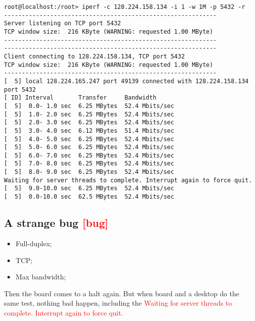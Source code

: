 \documentclass[a4paper]{report}
\begin{document}
\begin{lstlisting}
root@localhost:/root> iperf -c 128.224.158.134 -i 1 -w 1M -p 5432 -r
------------------------------------------------------------
Server listening on TCP port 5432
TCP window size:  216 KByte (WARNING: requested 1.00 MByte)
------------------------------------------------------------
------------------------------------------------------------
Client connecting to 128.224.158.134, TCP port 5432
TCP window size:  216 KByte (WARNING: requested 1.00 MByte)
------------------------------------------------------------
[  5] local 128.224.165.247 port 49139 connected with 128.224.158.134 port 5432
[ ID] Interval       Transfer     Bandwidth
[  5]  0.0- 1.0 sec  6.25 MBytes  52.4 Mbits/sec
[  5]  1.0- 2.0 sec  6.25 MBytes  52.4 Mbits/sec
[  5]  2.0- 3.0 sec  6.25 MBytes  52.4 Mbits/sec
[  5]  3.0- 4.0 sec  6.12 MBytes  51.4 Mbits/sec
[  5]  4.0- 5.0 sec  6.25 MBytes  52.4 Mbits/sec
[  5]  5.0- 6.0 sec  6.25 MBytes  52.4 Mbits/sec
[  5]  6.0- 7.0 sec  6.25 MBytes  52.4 Mbits/sec
[  5]  7.0- 8.0 sec  6.25 MBytes  52.4 Mbits/sec
[  5]  8.0- 9.0 sec  6.25 MBytes  52.4 Mbits/sec
Waiting for server threads to complete. Interrupt again to force quit.
[  5]  9.0-10.0 sec  6.25 MBytes  52.4 Mbits/sec
[  5]  0.0-10.0 sec  62.5 MBytes  52.4 Mbits/sec
\end{lstlisting}
\subsection{A strange bug \textcolor{red}{[bug]}}
\begin{itemize}
    \item Full-duplex;
    \item TCP;
    \item Max bandwidth;
\end{itemize}
Then the board comes to a halt again. But when board and a desktop do the same test, 
nothing bad happen, including the 
\textcolor{red}{Waiting for server threads to complete. Interrupt again to force quit.}
\end{document}
